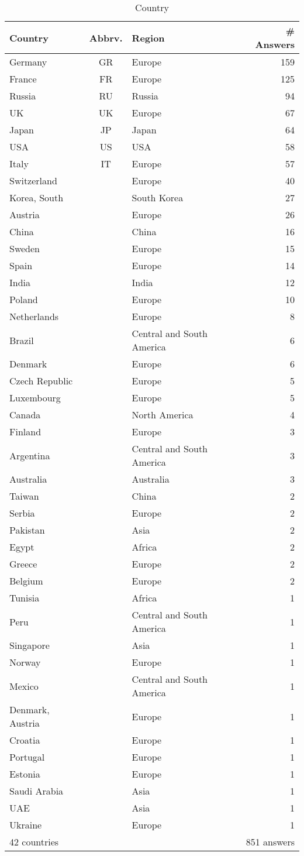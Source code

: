 \begin{table}[htb]%
\begin{center}%
\caption{Country}\label{tab:countries}%
\begin{tabular}{l|c|l|r}%
\hline%
Country & Abbrv. & Region & \# Answers \\%
\hline%
Germany&GR&Europe&159\\%
France&FR&Europe&125\\%
Russia&RU&Russia&94\\%
UK&UK&Europe&67\\%
Japan&JP&Japan&64\\%
USA&US&USA&58\\%
Italy&IT&Europe&57\\%
\hline%
Switzerland&&Europe&40\\%
Korea, South&&South Korea&27\\%
Austria&&Europe&26\\%
China&&China&16\\%
Sweden&&Europe&15\\%
Spain&&Europe&14\\%
India&&India&12\\%
Poland&&Europe&10\\%
Netherlands&&Europe&8\\%
Brazil&&Central and South America&6\\%
Denmark&&Europe&6\\%
Czech Republic&&Europe&5\\%
Luxembourg&&Europe&5\\%
Canada&&North America&4\\%
Finland&&Europe&3\\%
Argentina&&Central and South America&3\\%
Australia&&Australia&3\\%
Taiwan&&China&2\\%
Serbia&&Europe&2\\%
Pakistan&&Asia&2\\%
Egypt&&Africa&2\\%
Greece&&Europe&2\\%
Belgium&&Europe&2\\%
Tunisia&&Africa&1\\%
Peru&&Central and South America&1\\%
Singapore&&Asia&1\\%
Norway&&Europe&1\\%
Mexico&&Central and South America&1\\%
Denmark, Austria&&Europe&1\\%
Croatia&&Europe&1\\%
Portugal&&Europe&1\\%
Estonia&&Europe&1\\%
Saudi Arabia&&Asia&1\\%
UAE&&Asia&1\\%
Ukraine&&Europe&1\\%
\hline%
42 countries & & & 851 answers \\%
\hline%
\end{tabular}%
\end{center}%
\end{table}%
